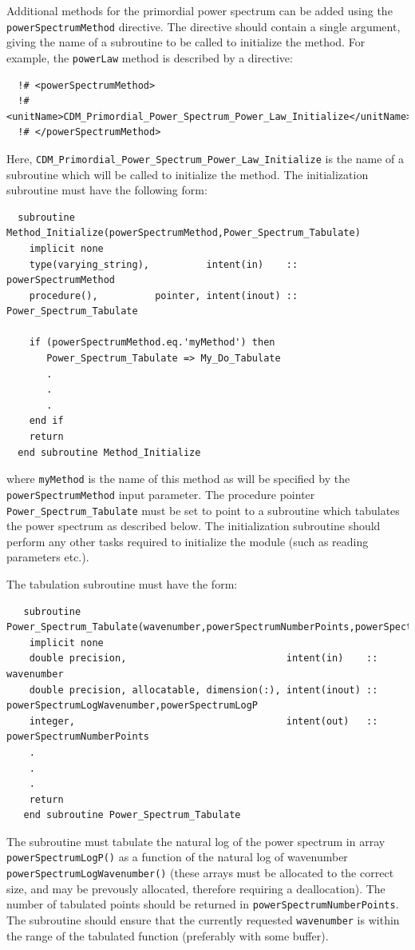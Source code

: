 Additional methods for the primordial power spectrum can be added using the {\tt powerSpectrumMethod} directive. The directive should contain a single argument, giving the name of a subroutine to be called to initialize the method. For example, the {\tt powerLaw} method is described by a directive:
\begin{verbatim}
  !# <powerSpectrumMethod>
  !#  <unitName>CDM_Primordial_Power_Spectrum_Power_Law_Initialize</unitName>
  !# </powerSpectrumMethod>
\end{verbatim}
Here, {\tt CDM\_Primordial\_Power\_Spectrum\_Power\_Law\_Initialize} is the name of a subroutine which will be called to initialize the method. The initialization subroutine must have the following form:
\begin{verbatim}
  subroutine Method_Initialize(powerSpectrumMethod,Power_Spectrum_Tabulate)
    implicit none
    type(varying_string),          intent(in)    :: powerSpectrumMethod
    procedure(),          pointer, intent(inout) :: Power_Spectrum_Tabulate
    
    if (powerSpectrumMethod.eq.'myMethod') then
       Power_Spectrum_Tabulate => My_Do_Tabulate
       .
       .
       .
    end if
    return
  end subroutine Method_Initialize
\end{verbatim}
where {\tt myMethod} is the name of this method as will be specified by the {\tt powerSpectrumMethod} input parameter. The procedure pointer {\tt Power\_Spectrum\_Tabulate} must be set to point to a subroutine which tabulates the power spectrum as described below. The initialization subroutine should perform any other tasks required to initialize the module (such as reading parameters etc.).

The tabulation subroutine must have the form:
\begin{verbatim}
   subroutine Power_Spectrum_Tabulate(wavenumber,powerSpectrumNumberPoints,powerSpectrumLogWavenumber,powerSpectrumLogP)
    implicit none
    double precision,                            intent(in)    :: wavenumber
    double precision, allocatable, dimension(:), intent(inout) :: powerSpectrumLogWavenumber,powerSpectrumLogP
    integer,                                     intent(out)   :: powerSpectrumNumberPoints
    .
    .
    .
    return
   end subroutine Power_Spectrum_Tabulate
\end{verbatim}
The subroutine must tabulate the natural log of the power spectrum in array {\tt powerSpectrumLogP()} as a function of the natural log of wavenumber {\tt powerSpectrumLogWavenumber()} (these arrays must be allocated to the correct size, and may be prevously allocated, therefore requiring a deallocation). The number of tabulated points should be returned in {\tt powerSpectrumNumberPoints}. The subroutine should ensure that the currently requested {\tt wavenumber} is within the range of the tabulated function (preferably with some buffer).

